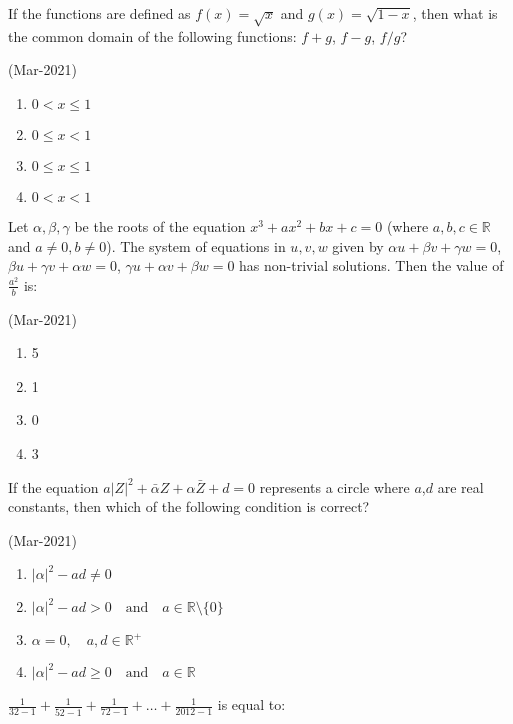 

\iffalse
\title{March:2021}
\author{DESABOINA SRI SATHWIK}
\section{mcq-single}
\fi
	\item
		If the functions are defined as $f(x)=\sqrt{x}$ and $g(x)=\sqrt{1-x}$, then what is the common domain of the following functions: $f+g$, $f-g$, $f/g$?

		\hfill{(Mar-2021)}
		\begin{multicols}{4}
		\begin{enumerate}
    \item $0 < x \leq 1$
    \item $0 \leq x < 1$
    \item $0 \leq x \leq 1$
    \item $0 < x < 1$
                \end{enumerate}
		\end{multicols}
	\item
		Let $\alpha, \beta, \gamma$ be the roots of the equation $x^3 + ax^2 + bx + c = 0$ (where $a, b, c \in \mathbb{R}$ and $a \neq 0, b \neq 0$). The system of equations in $u, v, w$ given by $\alpha u + \beta v + \gamma w = 0$, $\beta u + \gamma v + \alpha w = 0$, $\gamma u + \alpha v + \beta w = 0$ has non-trivial solutions. Then the value of $\frac{a^2}{b}$ is:

			\hfill{(Mar-2021)}
		\begin{multicols}{4}
               \begin{enumerate}
    \item 5
    \item 1
    \item 0
    \item 3
               \end{enumerate}
		\end{multicols}
       \item
	       If the equation $a{|Z|}^2 + \bar{\alpha}Z + \alpha \bar{Z} + d = 0$ represents a circle where $a$,$d$ are real constants, then which of the following condition is correct?

			\hfill{(Mar-2021)}
			\begin{multicols}{2}
		\begin{enumerate}
    \item $|\alpha|^2 - ad \neq 0$
    \item $|\alpha|^2 - ad > 0 \quad \text{and} \quad a \in \mathbb{R} \setminus \{0\}$
    \item $\alpha = 0, \quad a, d \in \mathbb{R}^+$
    \item $|\alpha|^2 - ad \geq 0 \quad \text{and} \quad a \in \mathbb{R}$
                \end{enumerate}
			\end{multicols}
	\item
		$ \frac{1}{32 - 1} + \frac{1}{52 - 1} + \frac{1}{72 - 1} + \ldots + \frac{1}{2012 - 1} $ is equal to:

